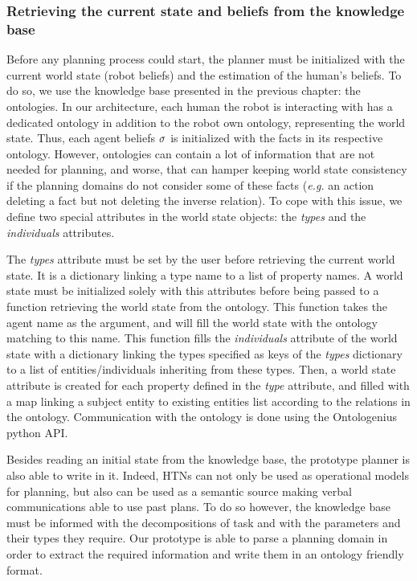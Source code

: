 \documentclass[a4paper,11pt,twoside]{StyleThese}
\begin{document}
\subsubsection{Retrieving the current state and beliefs from the knowledge base}
Before any planning process could start, the planner must be initialized with the current world state (robot beliefs) and the estimation of the human's beliefs. To do so, we use the knowledge base presented in the previous chapter: the ontologies. In our architecture, each human the robot is interacting with has a dedicated ontology in addition to the robot own ontology, representing the world state. Thus, each agent beliefs $\sigma$ is initialized with the facts in its respective ontology.
However, ontologies can contain a lot of information that are not needed for planning, and worse, that can hamper keeping world state consistency if the planning domains do not consider some of these facts (\textit{e.g.} an action deleting a fact but not deleting the inverse relation). To cope with this issue, we define two special attributes in the world state objects: the \textit{types} and the \textit{individuals} attributes.

The \textit{types} attribute must be set by the user before retrieving the current world state. It is a dictionary linking a type name to a list of property names. A world state must be initialized solely with this attributes before being passed to a function retrieving the world state from the ontology. This function takes the agent name as the argument, and will fill the world state with the ontology matching to this name. This function fills the \textit{individuals} attribute of the world state with a dictionary linking the types specified as keys of the  \textit{types} dictionary to a list of entities/individuals inheriting from these types. Then, a world state attribute is created for each property defined in the \textit{type} attribute, and filled with a map linking a subject entity to existing entities list according to the relations in the ontology. Communication with the ontology is done using the Ontologenius~\cite{sarthou2019ontologenius} python API.

Besides reading an initial state from the knowledge base, the prototype planner is also able to write in it. Indeed, HTNs can not only be used as operational models for planning, but also can be used as a semantic source making verbal communications able to use past plans. To do so however, the knowledge base must be informed with the decompositions of task and with the parameters and their types they require. Our prototype is able to parse a planning domain in order to extract the required information and write them in an ontology friendly format.
\end{document}
